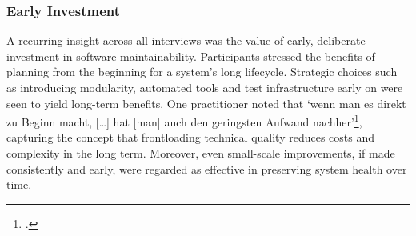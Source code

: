 \subsubsection{Early Investment}
A recurring insight across all interviews was the value of early, deliberate investment in software maintainability. Participants stressed the benefits of planning from the beginning for a system's long lifecycle. Strategic choices such as introducing modularity, automated tools and test infrastructure early on were seen to yield long-term benefits.
One practitioner noted that `wenn man es direkt zu Beginn macht, [\ldots] hat [man] auch den geringsten Aufwand nachher'\footcite{Interview32025}, capturing the concept that frontloading technical quality reduces costs and complexity in the long term. Moreover, even small-scale improvements, if made consistently and early, were regarded as effective in preserving system health over time.\\

